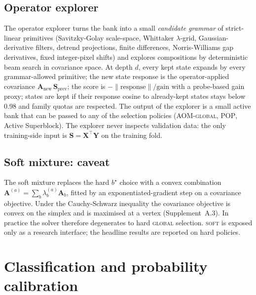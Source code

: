 \documentclass[review,a4paper]{elsarticle}
\newcommand{\Xmat}{\mathbf{X}}
\newcommand{\Ymat}{\mathbf{Y}}
\newcommand{\Amat}{\mathbf{A}}
\newcommand{\Smat}{\mathbf{S}}
\newcommand{\AOM}{\textsc{AOM}\xspace}
\newcommand{\POP}{\textsc{POP}\xspace}
\begin{document}
\subsection{Operator explorer}
\label{sec:algo-explorer}
The operator explorer turns the bank into a small \emph{candidate grammar}
of strict-linear primitives (Savitzky-Golay scale-space, Whittaker
$\lambda$-grid, Gaussian-derivative filters, detrend projections, finite
differences, Norris-Williams gap derivatives, fixed integer-pixel shifts)
and explores compositions by deterministic beam search in covariance
space. At depth $d$, every kept state expands by every grammar-allowed
primitive; the new state response is the operator-applied covariance
$\Amat_{\mathrm{new}}\,\Smat_{\mathrm{prev}}$; the score is
$-\|\mathrm{response}\|/\mathrm{gain}$ with a probe-based
gain proxy; states are kept if their response cosine to already-kept
states stays below 0.98 and family quotas are respected. The output of
the explorer is a small active bank that can be passed to any of the
selection policies (\AOM-\textsc{global}, \POP, Active Superblock).
The explorer never inspects validation data: the only training-side
input is $\Smat=\Xmat^\top \Ymat$ on the training fold.

\subsection{Soft mixture: caveat}
\label{sec:algo-soft}
The soft mixture replaces the hard $b^\star$ choice with a convex
combination $\Amat^{(a)}=\sum_b \lambda_b^{(a)} \Amat_b$, fitted by an
exponentiated-gradient step on a covariance objective. Under the
Cauchy-Schwarz inequality the covariance objective is convex on the
simplex and is maximised at a vertex (Supplement~A.3). In practice the
solver therefore degenerates to hard \textsc{global} selection.
\textsc{soft} is exposed only as a research interface; the headline
results are reported on hard policies.

\section{Classification and probability calibration}\label{sec:classification}
\end{document}
